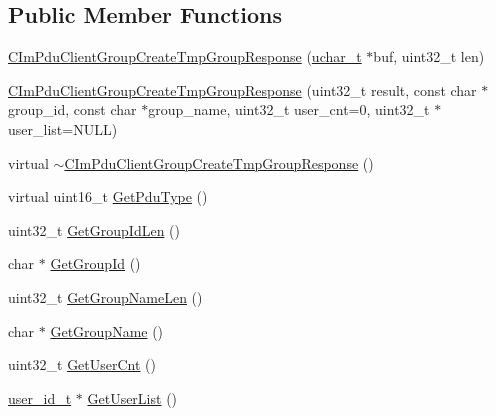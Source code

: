 \subsection*{Public Member Functions}
\begin{DoxyCompactItemize}
\item 
\hyperlink{class_c_im_pdu_client_group_create_tmp_group_response_ad950c70946be24e4a1cfd65bbc6a09b9}{C\+Im\+Pdu\+Client\+Group\+Create\+Tmp\+Group\+Response} (\hyperlink{base_2ostype_8h_a124ea0f8f4a23a0a286b5582137f0b8d}{uchar\+\_\+t} $\ast$buf, uint32\+\_\+t len)
\item 
\hyperlink{class_c_im_pdu_client_group_create_tmp_group_response_a07f28bdd6d57fd4bbcb02c2cc79eb4f1}{C\+Im\+Pdu\+Client\+Group\+Create\+Tmp\+Group\+Response} (uint32\+\_\+t result, const char $\ast$group\+\_\+id, const char $\ast$group\+\_\+name, uint32\+\_\+t user\+\_\+cnt=0, uint32\+\_\+t $\ast$user\+\_\+list=N\+U\+L\+L)
\item 
virtual \hyperlink{class_c_im_pdu_client_group_create_tmp_group_response_a59be1d734537aad9f8092fe9314c3632}{$\sim$\+C\+Im\+Pdu\+Client\+Group\+Create\+Tmp\+Group\+Response} ()
\item 
virtual uint16\+\_\+t \hyperlink{class_c_im_pdu_client_group_create_tmp_group_response_ac5bd153d93c718df69e1f1874547c665}{Get\+Pdu\+Type} ()
\item 
uint32\+\_\+t \hyperlink{class_c_im_pdu_client_group_create_tmp_group_response_a91202bee53af8a6f0274dea74058b2c3}{Get\+Group\+Id\+Len} ()
\item 
char $\ast$ \hyperlink{class_c_im_pdu_client_group_create_tmp_group_response_aea6cfd01678ee21c43552a11ab90dfe9}{Get\+Group\+Id} ()
\item 
uint32\+\_\+t \hyperlink{class_c_im_pdu_client_group_create_tmp_group_response_ab5a35c7c5b9b3ebe83c21083d4d47d21}{Get\+Group\+Name\+Len} ()
\item 
char $\ast$ \hyperlink{class_c_im_pdu_client_group_create_tmp_group_response_a594209228c06b977fe105e88a4e65e71}{Get\+Group\+Name} ()
\item 
uint32\+\_\+t \hyperlink{class_c_im_pdu_client_group_create_tmp_group_response_a0b7288286536dc9f92a76669fc49de05}{Get\+User\+Cnt} ()
\item 
\hyperlink{structuser__id__t}{user\+\_\+id\+\_\+t} $\ast$ \hyperlink{class_c_im_pdu_client_group_create_tmp_group_response_ae002865282eadfba0466b540bb8410e4}{Get\+User\+List} ()
\end{DoxyCompactItemize}
